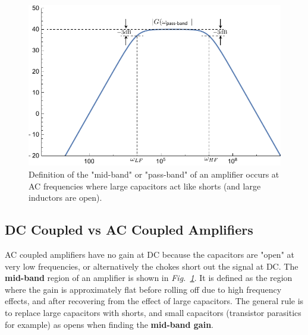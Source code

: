 \newpage
\begin{figure}[t]
\centering
\includegraphics[width=.9\columnwidth]{amp_bandpass}
\caption{Definition of the "mid-band" or "pass-band" of an amplifier occurs at AC frequencies where large capacitors act like shorts (and large inductors are open).}
\label{fig:midband}
\end{figure}
\subsection{DC Coupled vs AC Coupled Amplifiers}
AC coupled amplifiers have no gain at DC because the capacitors are "open" at very low frequencies, or alternatively the chokes short out the signal at DC.  The \textbf{mid-band} region of an amplifier is shown in \emph{Fig.~\ref{fig:midband}}.  It is defined as the region where the gain is approximately flat before rolling off due to high frequency effects, and after recovering from the effect of large capacitors. The general rule is to replace large capacitors with shorts, and small capacitors (transistor parasitics for example) as opens when finding the \textbf{mid-band gain}. 
